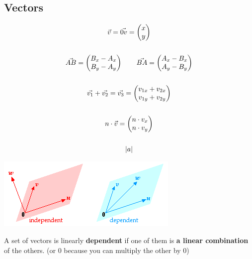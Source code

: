 \subsection{Vectors}

\begin{gather*}
\vec{v} = \vec{0v} = \begin{pmatrix} x \\ y \end{pmatrix} \\\\
\vec{AB} = \begin{pmatrix} B_x - A_x \\ B_y - A_y \end{pmatrix} \qquad \vec{BA} = \begin{pmatrix} A_x - B_x \\ A_y - B_y \end{pmatrix}\\\\
\vec{v_1} + \vec{v_2} = \vec{v_3} = \begin{pmatrix} v_{1x} + v_{2x} \\ v_{1y} + v_{2y} \end{pmatrix} \\\\
n\cdot\vec{v}=\begin{pmatrix} n\cdot v_x \\ n\cdot v_y \end{pmatrix} \\\\
\lvert a \rvert
\end{gather*}

\includegraphics{./mathematics/imgs/linear.png}

A set of vectors is linearly \textbf{dependent} if one of them is \textbf{a linear combination} of the others. (or 0 because you can multiply the other by 0)
